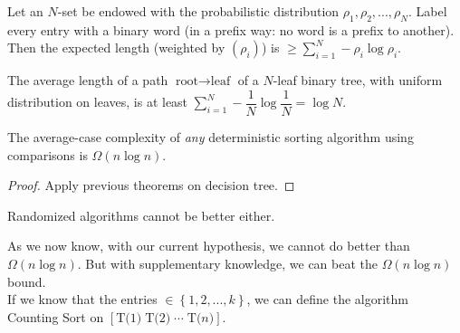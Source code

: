 \begin{theorem}[Shannon 1948]
Let an $N$-set be endowed with the probabilistic distribution $\rho_1, \rho_2,..., \rho_N$. Label every entry with a binary word (in a prefix way: no word is a prefix to another). Then the expected length (weighted by $(\rho_i)$) is $\geq \sum_{i=1}^{N} -\rho_i \log \rho_i$. 
\end{theorem}
\begin{theorem}
The average length of a path $\text{root} \rightarrow \text{leaf}$ of a $N$-leaf binary tree, with uniform distribution on leaves, is at least $\sum_{i=1}^N -\dfrac{1}{N} \log \dfrac{1}{N} = \log N$.
\end{theorem}
\begin{theorem}
The average-case complexity of \emph{any} deterministic sorting algorithm using comparisons is $\Omega (n\log n)$.
\end{theorem}
\begin{proof}
Apply previous theorems on decision tree.

\end{proof}

\begin{remark} Randomized algorithms cannot be better either. \end{remark}

As we now know, with our current hypothesis, we cannot do better than $\Omega (n\log n)$. But with supplementary knowledge, we can beat the $\Omega (n\log n)$ bound.\\

If we know that the entries $\in \left\{ 1,2,...,k \right\}$, we can define the algorithm Counting Sort on $\left[ \text{T(1)} \; \text{T(2)} \; \cdots \; \text{T(}n\text{)} \right]$.

